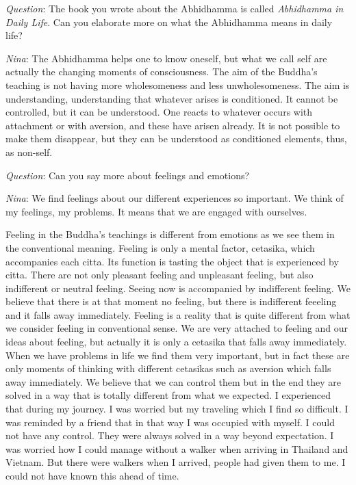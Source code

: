 \textit{Question}: The book you wrote about the Abhidhamma is called \textit{Abhidhamma in Daily Life}. Can you elaborate more on what the Abhidhamma means in daily life?


\textit{Nina}: The Abhidhamma helps one to know oneself, but what we call self are actually the changing moments of consciousness. The aim of the Buddha’s teaching is not having more wholesomeness and less unwholesomeness. The aim is understanding, understanding that whatever arises is conditioned. It cannot be controlled, but it can be understood. One reacts to whatever occurs with attachment or with aversion, and these have arisen already. It is not possible to make them disappear, but they can be understood as conditioned elements, thus, as non-self.


\textit{Question}: Can you say more about feelings and emotions?

\textit{Nina}: We find feelings about our different experiences so important. We think of my feelings, my problems. It means that we are engaged with ourselves. 

Feeling in the Buddha’s teachings is different from  emotions as we see them in the conventional meaning. Feeling is only a mental factor, cetasika, which accompanies each citta. Its function is tasting the object that is experienced by citta. There are not only pleasant feeling and unpleasant feeling, but also indifferent or neutral feeling. Seeing now is accompanied by indifferent feeling. We believe that there is at that moment no feeling, but there is indifferent feeeling and it falls away immediately. Feeling is a reality that is quite different from what we consider feeling in conventional sense. We are very attached to feeling and our ideas about feeling, but actually it is only a cetasika that falls away immediately.
When we have problems in life we find them very important, but in fact these are only moments of thinking with different cetasikas such as aversion which falls away immediately. We believe that we can control them but in the end they are solved in a way that is totally different from what we expected. I experienced that during my journey. I was worried but my traveling which I find so difficult. I was reminded by a friend that in that way I was occupied with myself. I could not have any control. They were always solved in a way beyond expectation. I was worried how I could manage without a walker when arriving in Thailand and Vietnam. But there were walkers when I arrived, people had given them to me. I could not have known this ahead of time. 

